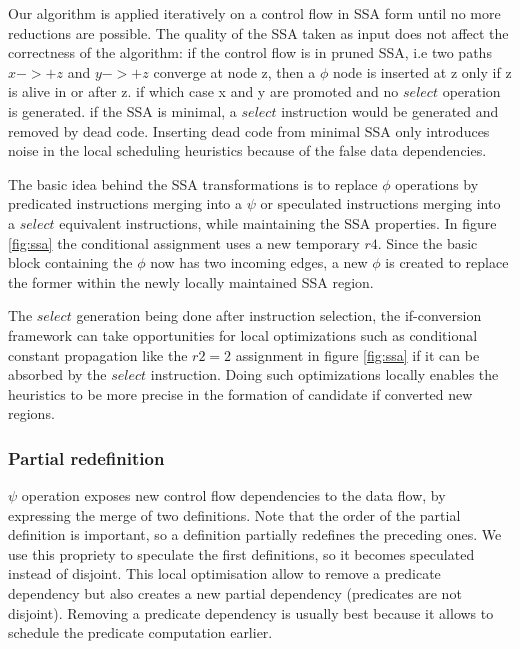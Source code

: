 Our algorithm is applied iteratively on a control flow in SSA form until no more reductions are possible. The quality of the SSA taken as input does not affect the correctness of the algorithm: if the control flow is in pruned SSA, i.e two paths $x->+z$ and $y->+z$ converge at node z, then a $\phi$ node is inserted at z only if z is alive in or after z. if which case x and y are promoted and no $select$ operation is generated. if the SSA is minimal, a $select$ instruction would be generated and removed by dead code. Inserting dead code from minimal SSA only introduces noise in the local scheduling heuristics because of the false data dependencies.

The basic idea behind the SSA transformations is to replace $\phi$ operations by predicated instructions merging into a $\psi$ or speculated instructions merging into a $select$ equivalent instructions, while maintaining the SSA properties. In figure \ref{fig:ssa} the conditional assignment uses a new temporary $r4$. Since the basic block containing the $\phi$ now has two incoming edges, a new $\phi$ is created to replace the former within the newly locally maintained SSA region.

The $select$ generation being done after instruction selection, the if-conversion framework can take opportunities for local optimizations such as conditional constant propagation like the $r2=2$ assignment in figure \ref{fig:ssa} if it can be absorbed by the $select$ instruction. Doing such optimizations locally enables the heuristics to be more precise in the formation of candidate if converted new regions.

\subsubsection{Partial redefinition}

$\psi$ operation exposes new control flow dependencies to the data flow, by expressing the merge of two definitions. Note that the order of the partial definition is important, so a definition partially redefines the preceding ones. We use this propriety to speculate the first definitions, so it becomes speculated instead of disjoint. This local optimisation allow to remove a predicate dependency but also creates a new partial dependency (predicates are not disjoint). Removing a predicate dependency is usually best because it allows to schedule the predicate computation earlier.

